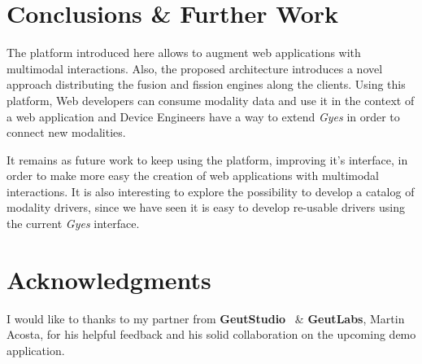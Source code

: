 \documentclass{llncs}
\begin{document}
\section{Conclusions \& Further Work}
The platform introduced here allows to augment web applications with multimodal interactions. Also, the proposed architecture introduces a novel approach distributing the fusion and fission engines along the clients. 
Using this platform, Web developers can consume modality data and use it in the context of a web application and Device Engineers have a way to extend \emph{Gyes} in order to connect new modalities. 

It remains as future work to keep using the platform, improving it's interface, in order to make more easy the creation of web applications with multimodal interactions. It is also interesting to explore the possibility to develop a catalog of modality drivers, since we have seen it is easy to develop re-usable drivers using the current \emph{Gyes} interface.

\section{Acknowledgments}
I would like to thanks to my partner from \textbf{GeutStudio} ~\& \textbf{GeutLabs}, Martin Acosta, for his helpful feedback and his solid collaboration on the upcoming demo application.



\end{document}
